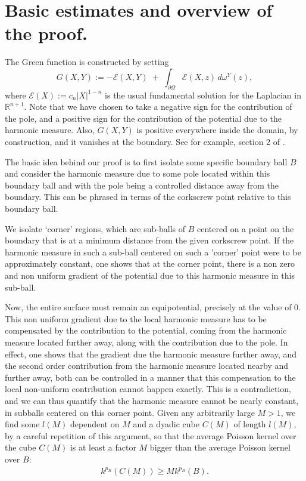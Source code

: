 \documentclass{article}
\newcounter{rmk}
\theoremstyle{plain}
\theoremstyle{plain}
\theoremstyle{definition}
\newtheorem{remark}[rmk]{Remark}
\theoremstyle{plain}
\begin{document}
\section{Basic estimates and overview of the proof.}
The Green function is constructed by setting
\begin{equation}\label{imp2}
G(X,Y) := -\mathcal{E}(X,Y)
\;+\;
\int_{\partial\Omega} \mathcal{E}(X , z)\, d\omega^{Y}(z),
\end{equation}
where $\mathcal{E}(X) := c_{n} |X|^{1-n}$ is the usual fundamental solution for the
Laplacian in $\mathbb{R}^{n+1}$. Note that we have chosen to take a negative sign for the contribution of the pole, and a positive sign for the contribution of the potential due to the harmonic measure. Also, $G(X,Y)$ is positive everywhere inside the domain, by construction, and it vanishes at the boundary. See for example, section 2 of \cite{HMMTZ17}.

The basic idea behind our proof is to first isolate some specific boundary ball $B$ and consider the harmonic measure due to some pole located within this boundary ball and with the pole being a controlled distance away from the boundary. This can be phrased in terms of the corkscrew point relative to this boundary ball.


We isolate `corner' regions, which are sub-balls of $B$ centered on a point on the boundary that is at a minimum distance from the given corkscrew point. If the harmonic measure in such a sub-ball centered on such a 'corner' point were to be approximately constant, one shows that at the corner point, there is a non zero and non uniform gradient of the potential due to this harmonic measure in this sub-ball.

Now, the entire surface must remain an equipotential, precisely at the value of $0$. This non uniform gradient due to the local harmonic measure has to be compensated by the contribution to the potential, coming from the harmonic measure located further away, along with the contribution due to the pole. In effect, one shows that the gradient due the harmonic measure further away, and the second order contribution from the harmonic measure located nearby and further away, both can be controlled in a manner that this compensation to the local non-uniform contribution cannot happen exactly. This is a contradiction, and we can thus quantify that the harmonic measure cannot be nearly constant, in subballs centered on this corner point. Given any arbitrarily large $M>1$, we find some $l(M)$ dependent on $M$ and a dyadic cube $C(M)$ of length $l(M)$, by a careful repetition of this argument, so that the average Poisson kernel over the cube $C(M)$ is at least a factor $M$ bigger than the average Poisson kernel over $B$:
\begin{align}\label{compare}
    k^{p_B}(C(M))\geq M k^{p_B}(B).
\end{align}
\end{document}
